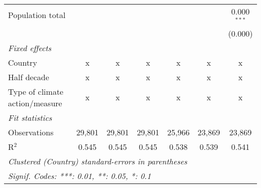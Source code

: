\begin{tabular}{lcccccc}
   Population total                                                        &         &             &              &               &               & 0.000$^{***}$\\   
                                                                           &         &             &              &               &               & (0.000)\\   
   \emph{Fixed effects}\\
   Country                                                                 & x       & x           & x            & x             & x             & x\\  
   Half decade                                                             & x       & x           & x            & x             & x             & x\\  
   Type of climate action/measure                                          & x       & x           & x            & x             & x             & x\\  
   \midrule \emph{Fit statistics}\\
   Observations                                                            & 29,801  & 29,801      & 29,801       & 25,966        & 23,869        & 23,869\\  
   R$^2$                                                                   & 0.545   & 0.545       & 0.545        & 0.538         & 0.539         & 0.541\\  
   \midrule
   \multicolumn{7}{l}{\emph{Clustered (Country) standard-errors in parentheses}}\\
   \multicolumn{7}{l}{\emph{Signif. Codes: ***: 0.01, **: 0.05, *: 0.1}}\\
\end{tabular}
\par\endgroup


